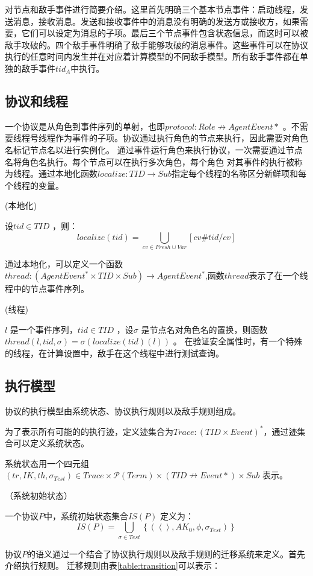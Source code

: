  对节点和敌手事件进行简要介绍。这里首先明确三个基本节点事件：启动线程，发送消息，接收消息。发送和接收事件中的消息没有明确的发送方或接收方，如果需要，它们可以设定为消息的子项。最后三个节点事件包含状态信息，而这时可以被敌手攻破的。四个敌手事件明确了敌手能够攻破的消息事件。这些事件可以在协议执行的任意时间内发生并在对应着计算模型的不同敌手模型。所有敌手事件都在单独的敌手事件$ti{{d}_{A}}$中执行。

\subsection{协议和线程}
一个协议是从角色到事件序列的单射，也即$protocol:Role\nrightarrow AgentEvent*$ 。不需要线程号线程作为事件的子项。协议通过执行角色的节点来执行，因此需要对角色名标记节点名以进行实例化。
通过事件运行角色来执行协议，一次需要通过节点名将角色名执行。每个节点可以在执行多次角色，每个角色
对其事件的执行被称为线程。通过本地化函数$localize:TID\to Sub$指定每个线程的名称区分新鲜项和每个线程的变量。

\begin{definition}{(本地化)}


	设$tid\in TID$ ，则：
	\[localize\left( tid \right)=\bigcup\limits_{cv\in Fresh\cup Var}{\left[ cv\#tid/cv \right]}\]
\end{definition}
通过本地化，可以定义一个函数$thread:(AgentEvent^*\times TID \times Sub)\to AgentEvent^*$,函数$thread$表示了在一个线程中的节点事件序列。

\begin{definition}{(线程)}


	$l$ 是一个事件序列，$tid\in TID$ ，设$\sigma$ 是节点名对角色名的置换，则函数$thread\left( l,tid,\sigma  \right)=\sigma \left( localize\left( tid \right)\left( l \right) \right)$ 。	在验证安全属性时，有一个特殊的线程，在计算设置中，敌手在这个线程中进行测试查询。
\end{definition}

\subsection{执行模型}
协议的执行模型由系统状态、协议执行规则以及敌手规则组成。

为了表示所有可能的的执行迹，定义迹集合为$Trace:(TID\times Event)^*$，通过迹集合可以定义系统状态。

系统状态用一个四元组$\left( tr,IK,th,{{\sigma }_{Test}} \right)\in Trace\times \mathcal{P}\left( Term \right)\times \left( TID\nrightarrow Event* \right)\times Sub$ 表示。
\begin{definition}{（系统初始状态）}

	一个协议$P$中，系统初始状态集合$IS\left( P \right)$ 定义为：
	\[IS\left( P \right)=\bigcup\limits_{\sigma \in Test}{\left\{ \left( \left\langle {} \right\rangle ,A{{K}_{0}},\phi ,{{\sigma }_{Test}} \right) \right\}}\]
	 \end{definition}
协议$P$的语义通过一个结合了协议执行规则以及敌手规则的迁移系统来定义。首先介绍执行规则。
迁移规则由表\ref{table:transition}可以表示：


